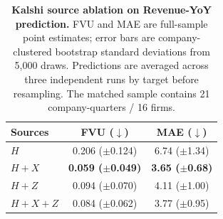 \begin{table}[t]
\centering
\caption{\textbf{Kalshi source ablation on Revenue-YoY prediction.}
FVU and MAE are full-sample point estimates; error bars are company-clustered bootstrap
standard deviations from 5,000 draws. Predictions are averaged across three independent runs
by target before resampling. The matched sample contains 21 company-quarters / 16 firms.}
\label{tab:kalshi_ablation}
\setlength{\tabcolsep}{15pt}
\begin{tabular}{lcc}
\toprule
Sources & FVU ($\downarrow$) & MAE ($\downarrow$) \\
\midrule
\quad $H$ & 0.206 {\footnotesize($\pm$0.124)} & 6.74 {\footnotesize($\pm$1.34)} \\
\quad $H+X$ & \textbf{0.059 {\footnotesize($\pm$0.049)}} & \textbf{3.65 {\footnotesize($\pm$0.68)}} \\
\quad $H+Z$ & 0.094 {\footnotesize($\pm$0.070)} & 4.11 {\footnotesize($\pm$1.00)} \\
\quad $H+X+Z$ & 0.084 {\footnotesize($\pm$0.062)} & 3.77 {\footnotesize($\pm$0.95)} \\
\bottomrule
\end{tabular}
\end{table}
